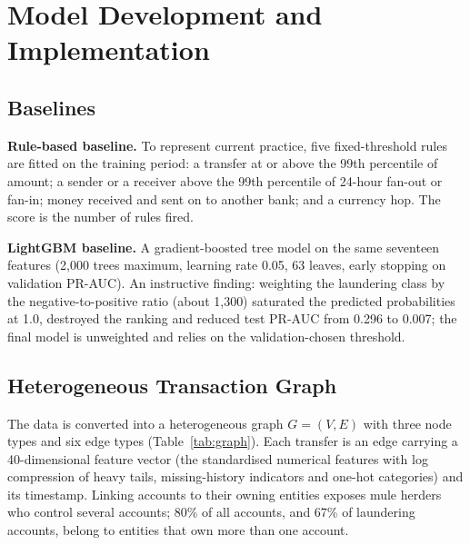 \section{Model Development and Implementation}

\subsection{Baselines}
\textbf{Rule-based baseline.} To represent current practice, five fixed-threshold rules are fitted on the training period: a transfer at or above the 99th percentile of amount; a sender or a receiver above the 99th percentile of 24-hour fan-out or fan-in; money received and sent on to another bank; and a currency hop. The score is the number of rules fired.

\textbf{LightGBM baseline.} A gradient-boosted tree model \cite{ke2017lightgbm} on the same seventeen features (2,000 trees maximum, learning rate 0.05, 63 leaves, early stopping on validation PR-AUC). An instructive finding: weighting the laundering class by the negative-to-positive ratio (about 1,300) saturated the predicted probabilities at 1.0, destroyed the ranking and reduced test PR-AUC from 0.296 to 0.007; the final model is unweighted and relies on the validation-chosen threshold.

\subsection{Heterogeneous Transaction Graph}
The data is converted into a heterogeneous graph $G=(V,E)$ with three node types and six edge types (Table~\ref{tab:graph}). Each transfer is an edge carrying a 40-dimensional feature vector (the standardised numerical features with log compression of heavy tails, missing-history indicators and one-hot categories) and its timestamp. Linking accounts to their owning entities exposes mule herders who control several accounts; 80\% of all accounts, and 67\% of laundering accounts, belong to entities that own more than one account.

